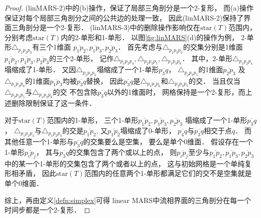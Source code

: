\begin{proof}
(linMARS-2)中的(b)操作，保证了局部三角剖分是一个2-复形，
而(a)操作保证对每个局部三角剖分之间的公共边的处理一致，
因此(linMARS-2)保持了界面三角剖分是一个2-复形．
(linMARS-3)中的删除操作影响仅在$\mathrm{star}(T)$范围内，
分别考虑$\mathrm{star}(T)$内的2-单形和1-单形．
以图\ref{fig:linMARS}(d)的操作为例，
2-单形$\triangle_{p_1 p_2 p_3}$有三个1维面
$\overline{p_1 p_2}, \overline{p_1 p_3}, \overline{p_2 p_3}$．
首先考虑与$\triangle_{p_1 p_2 p_3}$的交集分别是1维面
$\overline{p_1 p_2}, \overline{p_1 p_3}, \overline{p_2 p_3}$的三个2-单形，
记作$\triangle_{p_1 p_2 p_4}, \triangle_{p_2 p_3 p_5}, \triangle_{p_1 p_3 p_6}$．
其中，2-单形$\triangle_{p_1 p_2 p_4}$塌缩成了1-单形．
又因$\triangle_{p_1 p_2 p_3}$塌缩成了一个1-单形$\overline{p_3 q}$，
$\triangle_{p_2 p_3 p_5}$的1维面$\overline{p_2 p_3}$
及$\triangle_{p_1 p_3 p_6}$的1维面$\overline{p_1 p_3}$均被$\overline{p_3 q}$替换，
因此$\overline{p_3 q}$是$\triangle_{p_1 p_3 p_6}$和$\triangle_{p_2 p_3 p_5}$的交．
当且仅当$\triangle_{p_2 p_3 p_5}$与$\triangle_{p_1 p_3 p_6}$的交
不包含除$\overline{p_3 q}$以外的1维面时，
网格保持是一个2-复形，而上述删除限制保证了这一条件．


对于$\mathrm{star}(T)$范围内的1-单形，
三个1-单形$\overline{p_1 p_2}, \overline{p_1 p_3}, \overline{p_2 p_3}$
塌缩成了一个1-单形$\overline{p_3 q}$，
$\triangle_{p_1 p_2 p_4}$与$\triangle_{p_1 p_2 p_3}$的交是$\overline{p_1 p_2}$,
又$\overline{p_1 p_2}$塌缩成了0-单形，
$\overline{p_4 q}$与$\overline{p_3 q}$相交于点$q$．
 而其他任意一个1-单形与$\overline{p_3 q}$的交集要么是空集，
 要么是单个0维面．
 假设存在一个1-单形$\overline{p_i p_j}$，
 其与$\overline{p_3 q}$的交集包含了两个或以上的点，
 则$\overline{p_i p_j}$至少与$\overline{p_1 p_2}, \overline{p_1 p_3}, \overline{p_2 p_3}$
 中的某一个1-单形的交集包含了两个或者以上的点，
 这与初始网格是一个单纯复形相矛盾，
 因此$\mathrm{star}(T)$范围内的任意两个1-单形都满足它们的交不是空集就是单个0维面．

综上，再由定义\ref{defn:simplex}可得
linear MARS中流相界面的三角剖分在每一个时间步都是一个2-复形．
\end{proof}

